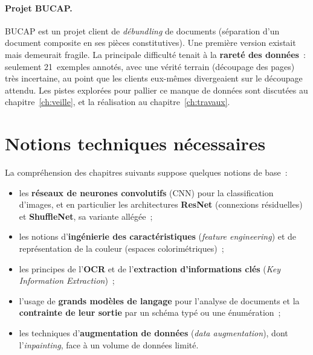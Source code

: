 \paragraph{Projet BUCAP.}
BUCAP est un projet client de \emph{débundling} de documents (séparation d'un
document composite en ses pièces constitutives). Une première version existait mais
demeurait fragile. La principale difficulté tenait à la \textbf{rareté des données}~:
seulement 21~exemples annotés, avec une vérité terrain (découpage des pages) très
incertaine, au point que les clients eux-mêmes divergeaient sur le découpage attendu.
Les pistes explorées pour pallier ce manque de données sont discutées au
chapitre~\ref{ch:veille}, et la réalisation au chapitre~\ref{ch:travaux}.

\section{Notions techniques nécessaires}

La compréhension des chapitres suivants suppose quelques notions de base~:

\begin{itemize}
  \item les \textbf{réseaux de neurones convolutifs} (CNN) pour la classification
        d'images, et en particulier les architectures \textbf{ResNet} (connexions
        résiduelles) et \textbf{ShuffleNet}, sa variante allégée~;
  \item les notions d'\textbf{ingénierie des caractéristiques} (\emph{feature
        engineering}) et de représentation de la couleur (espaces colorimétriques)~;
  \item les principes de l'\textbf{OCR} et de l'\textbf{extraction d'informations
        clés} (\emph{Key Information Extraction})~;
  \item l'usage de \textbf{grands modèles de langage} pour l'analyse de documents et
        la \textbf{contrainte de leur sortie} par un schéma typé ou une énumération~;
  \item les techniques d'\textbf{augmentation de données} (\emph{data augmentation}),
        dont l'\emph{inpainting}, face à un volume de données limité.
\end{itemize}
